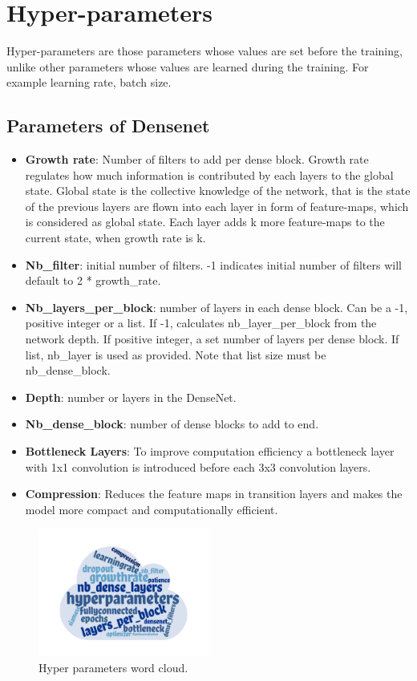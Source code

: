 \section{Hyper-parameters}
Hyper-parameters are those parameters whose values are set before the training, unlike other parameters whose values are learned during the training. 
For example learning rate, batch size. \cite{wikihyper}
\subsection{Parameters of Densenet}
\begin{itemize}
  \item \textbf{Growth rate}: Number of filters to add per dense block. Growth rate regulates how much information is contributed by each layers to the global state. 
  Global state is the collective knowledge of the network, that is the state of the previous layers are flown into each layer in form of feature-maps, 
  which is considered as global state. Each layer adds k more feature-maps to the current state, when growth rate is k.

  \item \textbf{Nb\_filter}: initial number of filters. -1 indicates initial number of filters will default to 2 * growth\_rate.

  \item \textbf{Nb\_layers\_per\_block}: number of layers in each dense block. Can be a -1, positive integer or a list. If -1, calculates nb\_layer\_per\_block from the network depth. 
  If positive integer, a set number of layers per dense block. If list, nb\_layer is used as provided. Note that list size must be nb\_dense\_block.

  \item \textbf{Depth}: number or layers in the DenseNet.

  \item \textbf{Nb\_dense\_block}: number of dense blocks to add to end.

  \item \textbf{Bottleneck Layers}: To improve computation efficiency a bottleneck layer with 1x1 convolution is introduced before each 3x3 convolution layers. 
  \item \textbf{Compression}: Reduces the feature maps in transition layers and makes the model more compact and computationally efficient.
\end{itemize}

\begin{figure}[ht]
\centering
\includegraphics[width=0.5\textwidth]{images/densenet/wordcloud_hyperparameters.png}
\caption{\label{fig:wordcloud_hp}Hyper parameters word cloud.}
\end{figure}

